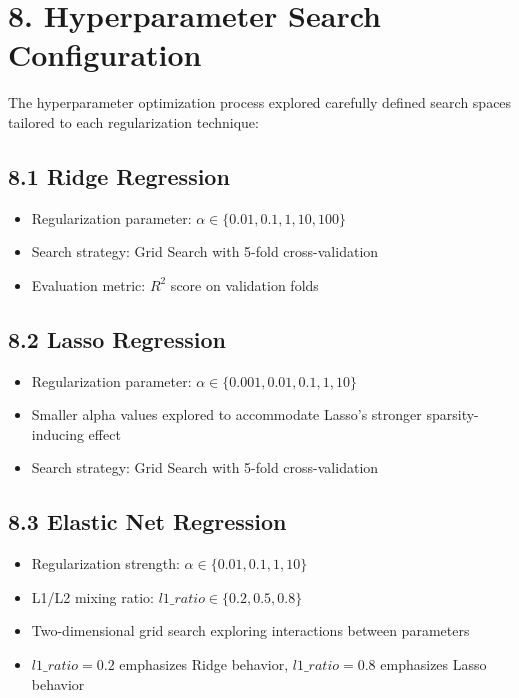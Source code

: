 \documentclass[11pt]{article}
\begin{document}
\section*{8. Hyperparameter Search Configuration}

The hyperparameter optimization process explored carefully defined search spaces tailored to each regularization technique:

\subsection*{8.1 Ridge Regression}
\begin{itemize}
\item Regularization parameter: $\alpha \in \{0.01, 0.1, 1, 10, 100\}$
\item Search strategy: Grid Search with 5-fold cross-validation
\item Evaluation metric: $R^2$ score on validation folds
\end{itemize}

\subsection*{8.2 Lasso Regression}
\begin{itemize}
\item Regularization parameter: $\alpha \in \{0.001, 0.01, 0.1, 1, 10\}$
\item Smaller alpha values explored to accommodate Lasso's stronger sparsity-inducing effect
\item Search strategy: Grid Search with 5-fold cross-validation
\end{itemize}

\subsection*{8.3 Elastic Net Regression}
\begin{itemize}
\item Regularization strength: $\alpha \in \{0.01, 0.1, 1, 10\}$
\item L1/L2 mixing ratio: $l1\_ratio \in \{0.2, 0.5, 0.8\}$
\item Two-dimensional grid search exploring interactions between parameters
\item $l1\_ratio = 0.2$ emphasizes Ridge behavior, $l1\_ratio = 0.8$ emphasizes Lasso behavior
\end{itemize}
\end{document}
